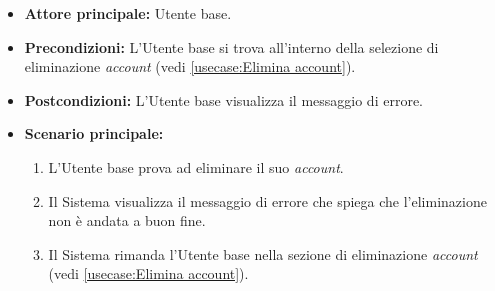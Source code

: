 \label{usecase:Errore eliminazione account}
\begin{itemize}
	\item \textbf{Attore principale:} Utente base.

	\item \textbf{Precondizioni:}
	      L'Utente base si trova all'interno della selezione di eliminazione \textit{account} (vedi \autoref{usecase:Elimina account}).

	\item \textbf{Postcondizioni:}
	      L'Utente base visualizza il messaggio di errore.

	\item \textbf{Scenario principale:}
	      \begin{enumerate}
		      \item L'Utente base prova ad eliminare il suo \textit{account}.
		      \item Il Sistema visualizza il messaggio di errore che spiega che l'eliminazione non è andata a buon fine.
		      \item Il Sistema rimanda l'Utente base nella sezione di eliminazione \textit{account} (vedi \autoref{usecase:Elimina account}).
	      \end{enumerate}
\end{itemize}
